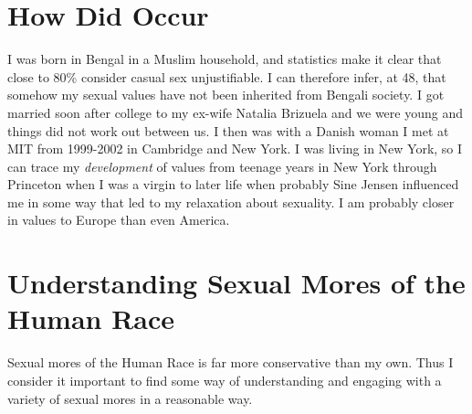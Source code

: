 \documentclass{amsart}
\begin{document}
\section{How Did Occur}
I was born in Bengal in a Muslim household, and statistics make it clear that close to 80\% consider casual sex unjustifiable.  I can therefore infer, at 48, that somehow my sexual values have not been inherited from Bengali society.  I got married soon after college to my ex-wife Natalia Brizuela and we were young and things did not work out between us.  I then was with a Danish woman I met at MIT from 1999-2002 in Cambridge and New York.  I was living in New York, so I can trace my {\em development} of values from teenage years in New York through Princeton when I was a virgin to later life when probably Sine Jensen influenced me in some way that led to my relaxation about sexuality.  I am probably closer in values to Europe than even America.  

\section{Understanding Sexual Mores of the Human Race}

Sexual mores of the Human Race is far more conservative than my own. Thus I consider it important to find some way of understanding and engaging with a variety of sexual mores in a reasonable way.  
\end{document}
